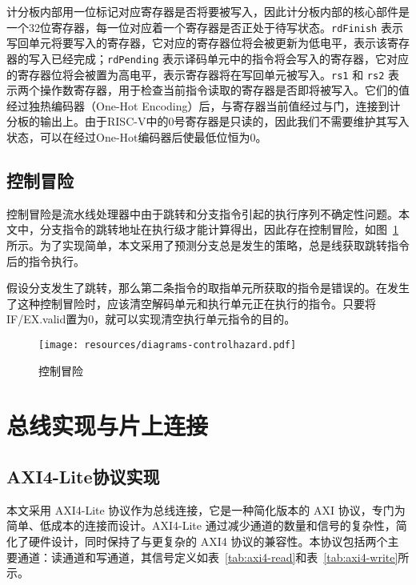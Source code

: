 计分板内部用一位标记对应寄存器是否将要被写入，因此计分板内部的核心部件是一个32位寄存器，每一位对应着一个寄存器是否正处于待写状态。\lstinline{rdFinish} 表示写回单元将要写入的寄存器，它对应的寄存器位将会被更新为低电平，表示该寄存器的写入已经完成；\lstinline{rdPending} 表示译码单元中的指令将会写入的寄存器，它对应的寄存器位将会被置为高电平，表示寄存器将在写回单元被写入。\lstinline{rs1} 和 \lstinline{rs2} 表示两个操作数寄存器，用于检查当前指令读取的寄存器是否即将被写入。它们的值经过独热编码器（One-Hot Encoding）后，与寄存器当前值经过与门，连接到计分板的输出上。由于RISC-V中的0号寄存器是只读的，因此我们不需要维护其写入状态，可以在经过One-Hot编码器后使最低位恒为0。

\subsection{控制冒险}

控制冒险是流水线处理器中由于跳转和分支指令引起的执行序列不确定性问题。本文中，分支指令的跳转地址在执行级才能计算得出，因此存在控制冒险，如图~\ref{fig:controlhazard} 所示。为了实现简单，本文采用了预测分支总是发生的策略，总是线获取跳转指令后的指令执行。

假设分支发生了跳转，那么第二条指令的取指单元所获取的指令是错误的。在发生了这种控制冒险时，应该清空解码单元和执行单元正在执行的指令。只要将IF/EX.valid置为0，就可以实现清空执行单元指令的目的。

\begin{figure}
    \centering
    \texttt{[image: resources/diagrams-controlhazard.pdf]}
    \caption{控制冒险}
    \label{fig:controlhazard}
\end{figure}

\section{总线实现与片上连接}

\subsection{AXI4-Lite协议实现}

本文采用 AXI4-Lite 协议作为总线连接，它是一种简化版本的 AXI 协议，专门为简单、低成本的连接而设计。AXI4-Lite 通过减少通道的数量和信号的复杂性，简化了硬件设计，同时保持了与更复杂的 AXI4 协议的兼容性。本协议包括两个主要通道：读通道和写通道，其信号定义如表~\ref{tab:axi4-read}和表~\ref{tab:axi4-write}所示。


